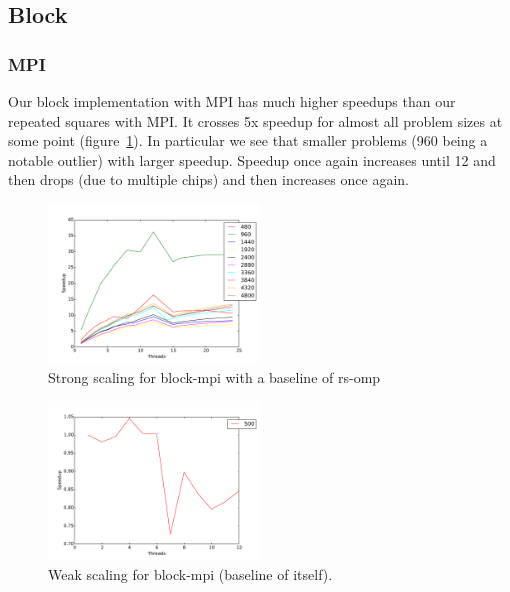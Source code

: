 \subsection{Block}

\subsubsection{MPI}

Our block implementation with MPI has much higher speedups than our repeated
squares with MPI. It crosses 5x speedup for almost all problem sizes at some
point (figure~\ref{strong-block-mpi}). In particular we see that smaller
problems (960 being a notable outlier) with larger speedup. Speedup once again
increases until 12 and then drops (due to multiple chips) and then increases
once again.

\begin{figure}[ht]
\centering
\includegraphics[width=0.5\textwidth]{plots/strong_block-mpi_baseline-rs-omp--1.pdf}
\caption{Strong scaling for block-mpi with a baseline of rs-omp}
\label{strong-block-mpi}
\end{figure}


\begin{figure}[ht]
\centering
\includegraphics[width=0.5\textwidth]{plots/weak_block-mpi.pdf}
\caption{Weak scaling for block-mpi (baseline of itself).}
\label{weak-block-mpi}
\end{figure}

